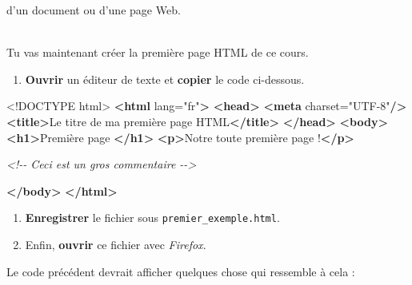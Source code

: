 \documentclass[a4paper,17pt]{extarticle}
\newenvironment{eleve}%
{\begin{activite}\color{noiramu}\\}
{\end{activite}}
\providecommand{\tightlist}{%
      \setlength{\itemsep}{0pt}\setlength{\parskip}{0pt}}
\newenvironment{Shaded}{}{}
\newcommand{\KeywordTok}[1]{\textcolor[rgb]{0.00,0.44,0.13}{\textbf{{#1}}}}
\newcommand{\DataTypeTok}[1]{\textcolor[rgb]{0.56,0.13,0.00}{{#1}}}
\newcommand{\StringTok}[1]{\textcolor[rgb]{0.25,0.44,0.63}{{#1}}}
\newcommand{\CommentTok}[1]{\textcolor[rgb]{0.38,0.63,0.69}{\textit{{#1}}}}
\newcommand{\OtherTok}[1]{\textcolor[rgb]{0.00,0.44,0.13}{{#1}}}
\newcommand{\NormalTok}[1]{{#1}}
\begin{document}
d'un document ou d'une page Web.
\begin{eleve}
    Tu vas maintenant créer la première page HTML de ce cours.

\begin{enumerate}
\def\labelenumi{\arabic{enumi}.}
\tightlist
\item
  \textbf{Ouvrir} un éditeur de texte et \textbf{copier} le code
  ci-dessous.
\end{enumerate}

\begin{Shaded}
\begin{Highlighting}[]
\DataTypeTok{\textless{}!DOCTYPE }\NormalTok{html}\DataTypeTok{\textgreater{}}
\KeywordTok{\textless{}html}\OtherTok{ lang=}\StringTok{"fr"}\KeywordTok{\textgreater{}}
\KeywordTok{\textless{}head\textgreater{}}
    \KeywordTok{\textless{}meta}\OtherTok{ charset=}\StringTok{"UTF{-}8"}\KeywordTok{/\textgreater{}}
    \KeywordTok{\textless{}title\textgreater{}}\NormalTok{Le titre de ma première page HTML}\KeywordTok{\textless{}/title\textgreater{}}
\KeywordTok{\textless{}/head\textgreater{}}
\KeywordTok{\textless{}body\textgreater{}}
    \KeywordTok{\textless{}h1\textgreater{}}\NormalTok{Première page }\KeywordTok{\textless{}/h1\textgreater{}}
    \KeywordTok{\textless{}p\textgreater{}}\NormalTok{Notre toute première page !}\KeywordTok{\textless{}/p\textgreater{}}

    \CommentTok{\textless{}!{-}{-} Ceci est un gros commentaire {-}{-}\textgreater{}}
    
\KeywordTok{\textless{}/body\textgreater{}}
\KeywordTok{\textless{}/html\textgreater{}}
\end{Highlighting}
\end{Shaded}

\begin{enumerate}
\def\labelenumi{\arabic{enumi}.}
\setcounter{enumi}{1}
\tightlist
\item
  \textbf{Enregistrer} le fichier sous \texttt{premier\_exemple.html}.
\item
  Enfin, \textbf{ouvrir} ce fichier avec \emph{Firefox}.
\end{enumerate}
        
        \end{eleve}\begin{reponse}
    Le code précédent devrait afficher quelques chose qui ressemble à cela :


\end{reponse}
\end{document}
